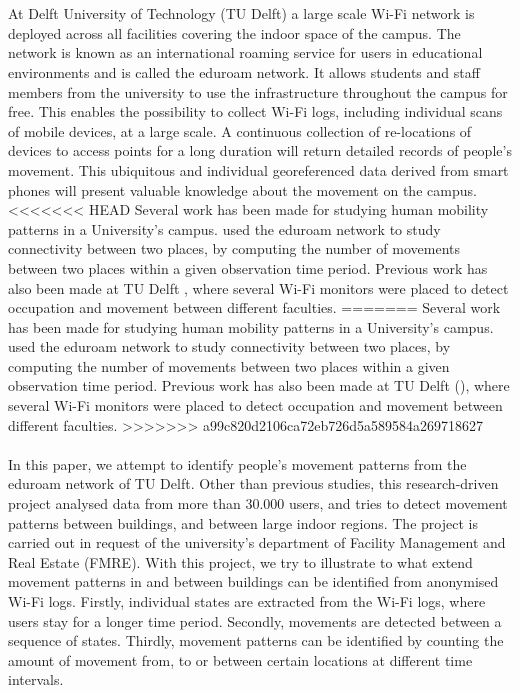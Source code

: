 \\\\
At Delft University of Technology (TU Delft) a large scale Wi-Fi network is deployed across all facilities covering the indoor space of the campus. The network is known as an international roaming service for users in educational environments and is called the eduroam network. It allows students and staff members from the university to use the infrastructure throughout the campus for free. This enables the possibility to collect Wi-Fi logs, including individual scans of mobile devices, at a large scale.  A continuous collection of re-locations of devices to access points for a long duration will return detailed records of people’s movement. This ubiquitous and individual georeferenced data derived from smart phones will present valuable knowledge about the movement on the campus. 
<<<<<<< HEAD
Several work has been made for studying human mobility patterns in a University’s campus.   \cite{meneses2012large} used the eduroam network to study connectivity between two places, by computing the number of movements between two places within a given observation time period. Previous work has also been made at TU Delft \cite{rhythmofthecampus}, where several Wi-Fi monitors were placed to detect occupation and movement between different faculties. 
=======
Several work has been made for studying human mobility patterns in a University’s campus. \cite{meneses2012large} used the eduroam network to study connectivity between two places, by computing the number of movements between two places within a given observation time period. Previous work has also been made at TU Delft (\cite{rhythmofthecampus}), where several Wi-Fi monitors were placed to detect occupation and movement between different faculties. 
>>>>>>> a99c820d2106ca72eb726d5a589584a269718627
\\\\
In this paper, we attempt to identify people’s movement patterns from the eduroam network of TU Delft. Other than previous studies, this research-driven project analysed data from more than 30.000 users, and tries to detect movement patterns between buildings, and between large indoor regions. The project is carried out in request of the university’s department of Facility Management and Real Estate (FMRE). With this project, we try to illustrate to what extend movement patterns in and between buildings can be identified from anonymised Wi-Fi logs. Firstly, individual states are extracted from the Wi-Fi logs, where users stay for a longer time period. Secondly, movements are detected between a sequence of states. Thirdly, movement patterns can be identified by counting the amount of movement from, to or between certain locations at different time intervals. 
